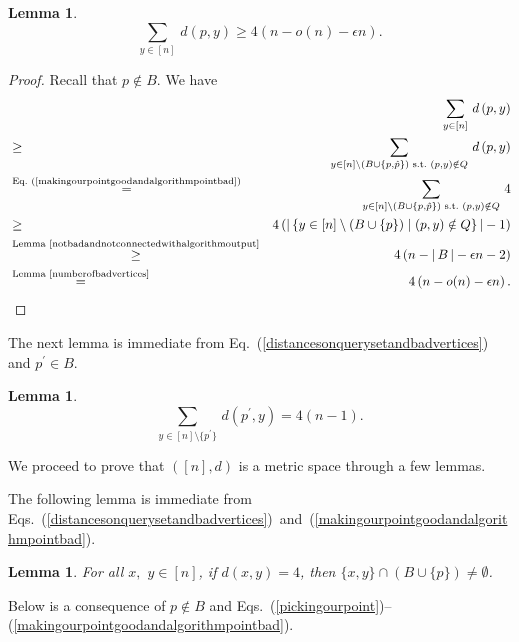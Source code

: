 \documentclass[letterpaper,12pt]{article}
\newtheorem{lemma}[theorem]{Lemma}
\begin{document}
{\begin{lemma}\label{outputpointisterribleifnotbad}
$$\sum_{y\in[n]}\,d\left(p,y\right)\ge 4\left(n-o(n)-\epsilon n\right).$$
\end{lemma}
\begin{proof}
Recall that $p\notin B$.
We have
\begin{eqnarray*}
&&\sum_{y\in[n]}\,d\left(p,y\right)\\
&\ge& \sum_{y\in[n]\setminus (B\cup\{p,\hat{p}\})
\text{ s.t.\ }(p,y)\notin Q}\,d\left(p,y\right)\\
&\stackrel{\text{Eq.~(\ref{makingourpointgoodandalgorithmpointbad})}}{=}&
\sum_{y\in[n]\setminus (B\cup\{p,\hat{p}\})
\text{ s.t.\ }(p,y)\notin Q}\,4\\
&\ge&
4\left(
\left|\,
\left\{y\in[n]\setminus \left(B\cup\{p\}\right)\mid \left(p,y\right)
\notin Q\right\}
\,\right|-1\right)\\
&\stackrel{\text{Lemma~\ref{notbadandnotconnectedwithalgorithmoutput}}}{\ge}&
4\left(n-|\,B\,|-\epsilon n-2\right)\\
&\stackrel{\text{Lemma~\ref{numberofbadvertices}}}{=}&
4\left(n-o(n)-\epsilon n\right).
\end{eqnarray*}
\end{proof}

The next lemma is immediate from Eq.~(\ref{distancesonquerysetandbadvertices})
and $p^\prime\in B$.

\begin{lemma}\label{outputpointisterribleifbad}
$$\sum_{y\in[n]\setminus\{p^\prime\}}\,
d\left(p^\prime,y\right)= 4\left(n-1\right).$$
\end{lemma}

We proceed to prove that $([n],d)$ is a metric space through a few lemmas.








The following
lemma is
immediate from
Eqs.~(\ref{distancesonquerysetandbadvertices})~and~(\ref{makingourpointgoodandalgorithmpointbad}).

\begin{lemma}\label{onlybadandalgorithmoutputcanhavedistance4}
For all $x,$ $y\in[n]$, if $d(x,y)=4$, then $\{x,y\}\cap (B\cup
\{p\})\neq\emptyset$.
\end{lemma}


Below is a consequence of $p\notin B$ and
Eqs.~(\ref{pickingourpoint})--(\ref{makingourpointgoodandalgorithmpointbad}).

}
\end{document}
